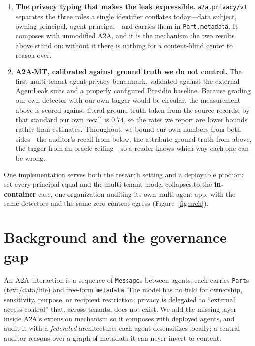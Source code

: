 \documentclass{article}
\newcommand{\ext}{\texttt{a2a.privacy/v1}}
\begin{document}
\begin{enumerate}
exactly, $20{,}000$ randomized evasion strategies produce none that teaches the
recipient more than the policy permits; ablating either integrity mechanism breaks
that, which is how we know both are load-bearing.
\item \textbf{The privacy typing that makes the leak expressible.} \ext{} separates
the three roles a single identifier conflates today---data subject, owning principal,
agent principal---and carries them in \texttt{Part.metadata}. It composes with
unmodified A2A, and it is the mechanism the two results above stand on: without it
there is nothing for a content-blind center to reason over.
\item \textbf{A2A-MT, calibrated against ground truth we do not control.} The first
multi-tenant agent-privacy benchmark, validated against the external AgentLeak suite
and a properly configured Presidio baseline. Because grading our own detector with our
own tagger would be circular, the measurement above is scored against literal ground
truth taken from the source records; by that standard our own recall is $0.74$, so the
rates we report are lower bounds rather than estimates. Throughout, we bound our own
numbers from both sides---the auditor's recall from below, the attribute ground
truth from above, the tagger from an oracle ceiling---so a reader knows which way
each one can be wrong.
\end{enumerate}
\noindent One implementation serves both the research setting and a deployable
product: set every principal equal and the multi-tenant model collapses to the
\textbf{in-container} case, one organization auditing its own multi-agent app,
with the same detectors and the same zero content egress (Figure~\ref{fig:arch}).




\section{Background and the governance gap}
An A2A interaction is a sequence of \texttt{Message}s between agents; each carries
\texttt{Part}s (text/data/file) and free-form \texttt{metadata}. The model has no
field for ownership, sensitivity, purpose, or recipient restriction; privacy is
delegated to ``external access control'' that, across tenants, does not exist. We
add the missing layer inside A2A's extension mechanism so it composes with
deployed agents, and audit it with a \emph{federated} architecture: each agent
desensitizes locally; a central auditor reasons over a graph of metadata it can
never invert to content.
\end{document}

